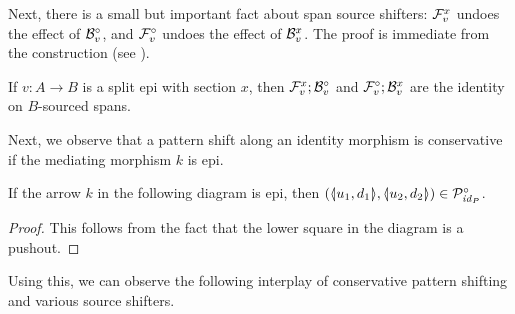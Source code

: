 %
Next, there is a small but important fact about span source shifters: $\rF v x$ undoes the effect of $\dB v$, and $\dF v$ undoes the effect of $\rB v x$. The proof is immediate from the construction (see ).
%
\begin{lemma}
If $v:A\to B$ is a split epi with section $x$, then $\rF v x;\dB v$ and $\dF v;\rB v x$ are the identity on $B$-sourced spans.
\end{lemma}
%
Next, we observe that a pattern shift along an identity morphism is conservative if the mediating morphism $k$ is epi.

\begin{lemma}
If the arrow $k$ in the following diagram is epi, then $(\spanof{u_1}{d_1},\spanof{u_2}{d_2})\in \ccP_{\id_P}$.
\begin{center}
\end{center}
\end{lemma}
%
\begin{proof}
This follows from the fact that the lower square in the diagram is a pushout.
\end{proof}
%
Using this, we can observe the following interplay of conservative pattern shifting and various source shifters.

